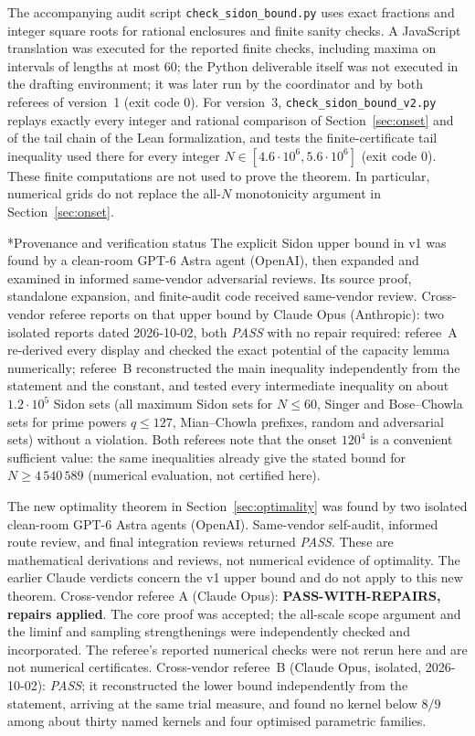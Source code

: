 \documentclass[10pt]{article}
\makeatletter
\numberwithin{equation}{section}
\theoremstyle{remark}
\renewcommand\section{\@startsection{section}{1}{\z@}{-2.6ex \@plus -.8ex \@minus -.2ex}{1.3ex \@plus .2ex}{\normalfont\large\bfseries}}
\makeatother
\begin{document}
The accompanying audit script \texttt{check\_sidon\_bound.py} uses exact
fractions and integer square roots for rational enclosures and finite
sanity checks. A JavaScript translation was executed for the reported
finite checks, including maxima on intervals of lengths at most $60$;
the Python deliverable itself was not executed in the drafting environment;
it was later run by the coordinator and by both referees of version~1
(exit code 0). For version~3, \texttt{check\_sidon\_bound\_v2.py} replays
exactly every integer and rational comparison of Section~\ref{sec:onset}
and of the tail chain of the Lean formalization, and tests the
finite-certificate tail inequality used there for every integer
$N\in[4.6\cdot10^6,5.6\cdot10^6]$ (exit code 0).
These finite computations are not used to prove the theorem. In
particular, numerical grids do not replace the all-$N$ monotonicity
argument in Section~\ref{sec:onset}.

\section*{Provenance and verification status}
The explicit Sidon upper bound in v1 was found by a clean-room GPT-6
Astra agent (OpenAI), then expanded and examined in informed same-vendor
adversarial reviews. Its source proof, standalone expansion, and finite-audit
code received same-vendor review. Cross-vendor referee reports on that
upper bound by Claude Opus (Anthropic): two isolated reports dated
2026-10-02, both \emph{PASS} with no repair required: referee~A re-derived every display and checked the exact potential of the capacity lemma numerically; referee~B reconstructed the main inequality independently from the statement and the constant, and tested every intermediate inequality on about $1.2\cdot10^5$ Sidon sets (all maximum Sidon sets for $N\le60$, Singer and Bose--Chowla sets for prime powers $q\le127$, Mian--Chowla prefixes, random and adversarial sets) without a violation. Both referees note that the onset $120^4$ is a convenient sufficient value: the same inequalities already give the stated bound for $N\ge4\,540\,589$ (numerical evaluation, not certified here).

The new optimality theorem in Section~\ref{sec:optimality} was found by
two isolated clean-room GPT-6 Astra agents (OpenAI). Same-vendor
self-audit, informed route review, and final integration reviews returned
\emph{PASS}. These are mathematical derivations and reviews, not
numerical evidence of optimality. The earlier Claude verdicts concern
the v1 upper bound and do not apply to this new theorem.
Cross-vendor referee A (Claude Opus): \textbf{PASS-WITH-REPAIRS,
repairs applied}. The core proof was accepted; the all-scale scope
argument and the liminf and sampling strengthenings were independently
checked and incorporated. The referee's reported numerical checks were
not rerun here and are not numerical certificates.
Cross-vendor referee~B (Claude Opus, isolated, 2026-10-02): \emph{PASS}; it reconstructed the lower bound independently from the statement, arriving at the same trial measure, and found no kernel below $8/9$ among about thirty named kernels and four optimised parametric families.
\end{document}
